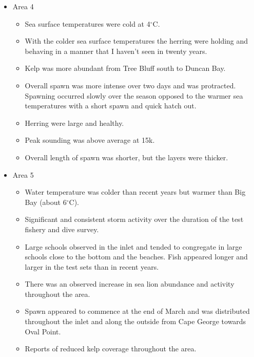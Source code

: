 \begin{itemize}

\item{Area 4}

\begin{itemize}

\item Sea surface temperatures were cold at 4$^\circ\text{C}$.

\item With the colder sea surface temperatures the herring were holding and
behaving in a manner that I haven't seen in twenty years.

\item Kelp was more abundant from Tree Bluff south to Duncan Bay. 

\item Overall spawn was more intense over two days and was protracted.
Spawning occurred slowly over the season opposed to the warmer sea temperatures with a short spawn and quick hatch out.

\item Herring were large and healthy.

\item Peak sounding was above average at 15k.

\item Overall length of spawn was shorter, but the layers were thicker.

\end{itemize}

\item{Area 5}

\begin{itemize}

\item Water temperature was colder than recent years but warmer than Big Bay (about 6$^\circ\text{C}$).

\item Significant and consistent storm activity over the duration of the test fishery and dive survey.

\item Large schools observed in the inlet and tended to congregate in large schools
close to the bottom and the beaches.
Fish appeared longer and larger in the test sets than in recent years.

\item There was an observed increase in sea lion abundance and activity throughout the area.

\item Spawn appeared to commence at the end of March and was distributed
throughout the inlet and along the outside from Cape George towards Oval Point.

\item Reports of reduced kelp coverage throughout the area.

\end{itemize}

\end{itemize}